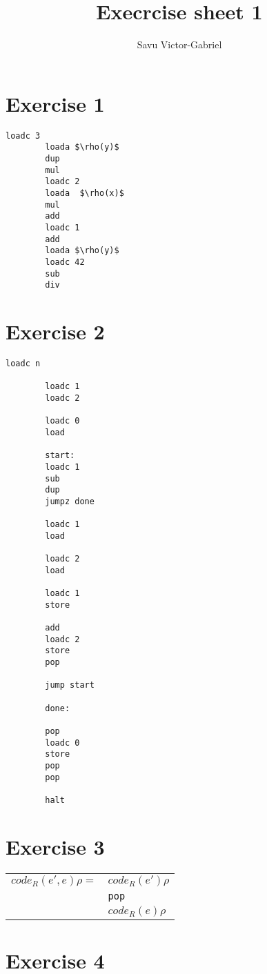 \documentclass[10pt,a4paper]{article}
\title{Execrcise sheet 1}
\author{Savu Victor-Gabriel}
\begin{document}
	\maketitle
	
	\section{Exercise 1}
	
	\begin{lstlisting}[mathescape]
		loadc 3
		loada $\rho(y)$
		dup
		mul
		loadc 2
		loada  $\rho(x)$
		mul
		add
		loadc 1
		add
		loada $\rho(y)$
		loadc 42
		sub
		div
	\end{lstlisting}
	
	\section{Exercise 2}
	
	\begin{lstlisting}[mathescape]
		loadc n
		
		loadc 1
		loadc 2
		
		loadc 0
		load
		
		start:
		loadc 1
		sub
		dup
		jumpz done
		
		loadc 1
		load
		
		loadc 2
		load
		
		loadc 1
		store 
		
		add
		loadc 2
		store
		pop
		
		jump start
		
		done:
		
		pop
		loadc 0
		store
		pop
		pop
		
		halt
	\end{lstlisting}
	
	\section{Exercise 3}
	
	\begin{tabular}{l l}
		$code_R(e',e) \rho = $ & $code_R(e') \rho$\\
		& \texttt{pop} \\
		& $code_R(e) \rho$
	\end{tabular}
	
	\section{Exercise 4}
	
\end{document}
